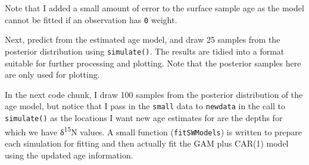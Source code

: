 \documentclass[12pt,]{article}
\newenvironment{Shaded}{\begin{snugshade}}{\end{snugshade}}
\newcommand{\KeywordTok}[1]{\textcolor[rgb]{0.13,0.29,0.53}{\textbf{{#1}}}}
\newcommand{\DataTypeTok}[1]{\textcolor[rgb]{0.13,0.29,0.53}{{#1}}}
\newcommand{\DecValTok}[1]{\textcolor[rgb]{0.00,0.00,0.81}{{#1}}}
\newcommand{\StringTok}[1]{\textcolor[rgb]{0.31,0.60,0.02}{{#1}}}
\newcommand{\NormalTok}[1]{{#1}}
\begin{document}
Note that I added a small amount of error to the surface sample age as
the model cannot be fitted if an observation has \texttt{0} weight.

Next, predict from the estimated age model, and draw 25 samples from the
posterior distribution using \texttt{simulate()}. The results are tidied
into a format suitable for further processing and plotting. Note that
the posterior samples here are only used for plotting.

\begin{Shaded}
\end{Shaded}

In the next code chunk, I draw 100 samples from the posterior
distribution of the age model, but notice that I pass in the
\texttt{small} data to \texttt{newdata} in the call to
\texttt{simulate()} as the locations I want new age estimates for are
the depths for which we have δ\textsuperscript{15}N values. A small
function (\texttt{fitSWModels}) is written to prepare each simulation
for fitting and then actually fit the GAM plus CAR(1) model using the
updated age information.
\end{document}
